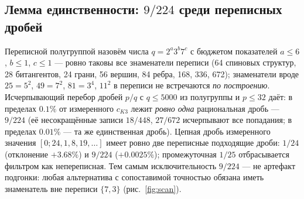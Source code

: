 \documentclass[11pt,a4paper]{article}
\theoremstyle{definition}
\theoremstyle{remark}
\begin{document}
\begin{table}[htbp]
\centering
\small
\caption{Провенанс: все точные появления $224$ и $672$ в переписи
$\{7,3\}$ и башни Гурвица.}
\label{tab:prov}
\end{table}

\subsection{Лемма единственности: $9/224$ среди переписных дробей}

Переписной полугруппой назовём числа $q = 2^a 3^b 7^c$ с бюджетом показателей
$a \le 6$, $b \le 1$, $c \le 1$ --- ровно таковы все знаменатели переписи
(64 спиновых структур, 28 битангентов, 24 грани, 56 вершин, 84 ребра, 168,
336, 672); знаменатели вроде $25 = 5^2$, $49 = 7^2$, $81 = 3^4$, $11^2$
в переписи не встречаются \emph{по построению}. Исчерпывающий перебор дробей
$p/q$ с $q \le 5000$ из полугруппы и $p \le 32$ даёт: в пределах $0.1\%$ от
измеренного $c_{K3}$ лежит \emph{ровно одна} рациональная дробь ---
$9/224$ (её несокращённые записи $18/448$, $27/672$ исчерпывают все попадания;
в пределах $0.01\%$ --- та же единственная дробь). Цепная дробь измеренного
значения $[0; 24, 1, 8, 19, \ldots]$ имеет ровно две переписные подходящие
дроби: $1/24$ (отклонение $+3.68\%$) и $9/224$ ($+0.0025\%$); промежуточная
$1/25$ отбрасывается фильтром как непереписная. Тем самым исключительность
$9/224$ --- не артефакт подгонки: любая альтернатива с сопоставимой точностью
обязана иметь знаменатель вне переписи $\{7,3\}$ (рис.~\ref{fig:scan}).
\end{document}
